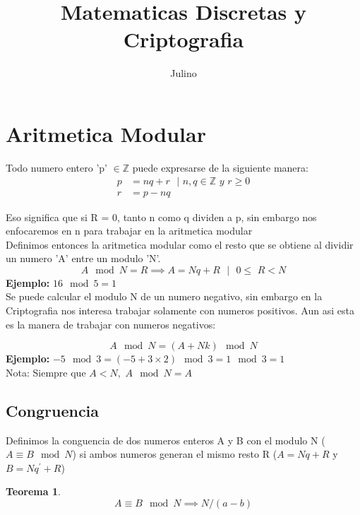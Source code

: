 \documentclass{article}
\title{Matematicas Discretas y Criptografia}
\author{Julino}
\begin{document}
\maketitle
\newtheorem{theorem}{Teorema}[section]
\renewcommand \qedsymbol{}
\renewcommand{\thefootnote}{\fnsymbol{footnote}}

\newcommand{\SP}{\,\,}

\pagebreak
\section{Aritmetica Modular}
Todo numero entero 'p' $\in \mathbb{Z}$ puede expresarse de la siguiente manera:
\begin{equation}
    \label{divisibilidad}
    \begin{split}
        p &= nq + r \SP\SP \vert \SP n,q \in \mathbb{Z} \SP y \SP r \geq 0\\
        r &= p - nq
    \end{split}
\end{equation}

Eso significa que si R = 0, tanto n como q dividen a p, sin embargo nos enfocaremos
en n para trabajar en la aritmetica modular\\

Definimos entonces la aritmetica modular como el resto que se obtiene al dividir un
numero 'A' entre un modulo 'N'.
$$A\mod{N} = R \implies A = Nq + R\SP\SP \vert \SP\SP 0 \le \SP  R < N$$
\textbf{Ejemplo:} $16 \mod{5} = 1$\\

Se puede calcular el modulo N de un numero negativo, sin embargo en la Criptografia
nos interesa trabajar solamente con numeros positivos. Aun asi esta es la manera de
trabajar con numeros negativos:

$$A\mod{N} = (A + Nk) \mod{N}$$
\textbf{Ejemplo:} $-5 \mod{3} = (-5 + 3\times2) \mod{3} = 1\mod{3} = 1$\\
Nota: Siempre que $A < N, \SP A \mod{N} = A$

\subsection{Congruencia} \label{congruencia}
Definimos la conguencia de dos numeros enteros A y B con el modulo N ($A \equiv B \mod N$) si ambos
numeros generan el mismo resto R ($A = Nq + R$ y $B = Nq^\prime + R$)

\begin{theorem}
    $$ A \equiv B \mod N \implies N / (a-b)$$
\end{theorem}
\end{document}
